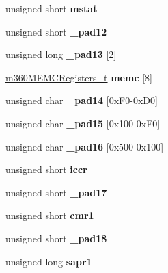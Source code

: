 \begin{DoxyCompactItemize}
unsigned short {\bfseries mstat}
\item 
\mbox{\label{structm360___ae47b959ae54ad6737b12fa899f94d3aa}} 
unsigned short {\bfseries \+\_\+pad12}
\item 
\mbox{\label{structm360___af485e313807e37b5b770040d80631caa}} 
unsigned long {\bfseries \+\_\+pad13} \mbox{[}2\mbox{]}
\item 
\mbox{\label{structm360___ae19ff038de191f2adfef3e6c92d4bfa5}} 
\mbox{\hyperlink{structm360MEMCRegisters__}{m360\+M\+E\+M\+C\+Registers\+\_\+t}} {\bfseries memc} \mbox{[}8\mbox{]}
\item 
\mbox{\label{structm360___acc44d625843a21d314ce4c26eb43fbbc}} 
unsigned char {\bfseries \+\_\+pad14} \mbox{[}0x\+F0-\/0x\+D0\mbox{]}
\item 
\mbox{\label{structm360___ac4c2c1d3eb2dfa66551b4f9041500f31}} 
unsigned char {\bfseries \+\_\+pad15} \mbox{[}0x100-\/0x\+F0\mbox{]}
\item 
\mbox{\label{structm360___ae3422d8c8b8770c9533df0154c628ad8}} 
unsigned char {\bfseries \+\_\+pad16} \mbox{[}0x500-\/0x100\mbox{]}
\item 
\mbox{\label{structm360___aed2fa7de036e30acfd5fb196eb933303}} 
unsigned short {\bfseries iccr}
\item 
\mbox{\label{structm360___ab0d9483035772ace1f1ca6eff4c62cd6}} 
unsigned short {\bfseries \+\_\+pad17}
\item 
\mbox{\label{structm360___a9bea2e2fb3d102ad6feadd8bcbd0b17b}} 
unsigned short {\bfseries cmr1}
\item 
\mbox{\label{structm360___a16dfddecd36f4d143dcdca198013d2e4}} 
unsigned short {\bfseries \+\_\+pad18}
\item 
\mbox{\label{structm360___a7fe70cb6bd7c7fa0a727f906c2b46bd3}} 
unsigned long {\bfseries sapr1}
\item 
\mbox{\label{structm360___a57008d7e1e4800177fd9d8d61df199fa}} 

\end{DoxyCompactItemize}
